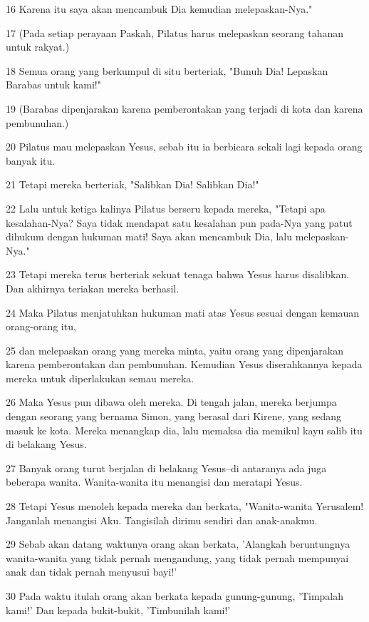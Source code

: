 \par 16 Karena itu saya akan mencambuk Dia kemudian melepaskan-Nya."
\par 17 (Pada setiap perayaan Paskah, Pilatus harus melepaskan seorang tahanan untuk rakyat.)
\par 18 Semua orang yang berkumpul di situ berteriak, "Bunuh Dia! Lepaskan Barabas untuk kami!"
\par 19 (Barabas dipenjarakan karena pemberontakan yang terjadi di kota dan karena pembunuhan.)
\par 20 Pilatus mau melepaskan Yesus, sebab itu ia berbicara sekali lagi kepada orang banyak itu.
\par 21 Tetapi mereka berteriak, "Salibkan Dia! Salibkan Dia!"
\par 22 Lalu untuk ketiga kalinya Pilatus berseru kepada mereka, "Tetapi apa kesalahan-Nya? Saya tidak mendapat satu kesalahan pun pada-Nya yang patut dihukum dengan hukuman mati! Saya akan mencambuk Dia, lalu melepaskan-Nya."
\par 23 Tetapi mereka terus berteriak sekuat tenaga bahwa Yesus harus disalibkan. Dan akhirnya teriakan mereka berhasil.
\par 24 Maka Pilatus menjatuhkan hukuman mati atas Yesus sesuai dengan kemauan orang-orang itu,
\par 25 dan melepaskan orang yang mereka minta, yaitu orang yang dipenjarakan karena pemberontakan dan pembunuhan. Kemudian Yesus diserahkannya kepada mereka untuk diperlakukan semau mereka.
\par 26 Maka Yesus pun dibawa oleh mereka. Di tengah jalan, mereka berjumpa dengan seorang yang bernama Simon, yang berasal dari Kirene, yang sedang masuk ke kota. Mereka menangkap dia, lalu memaksa dia memikul kayu salib itu di belakang Yesus.
\par 27 Banyak orang turut berjalan di belakang Yesus--di antaranya ada juga beberapa wanita. Wanita-wanita itu menangisi dan meratapi Yesus.
\par 28 Tetapi Yesus menoleh kepada mereka dan berkata, "Wanita-wanita Yerusalem! Janganlah menangisi Aku. Tangisilah dirimu sendiri dan anak-anakmu.
\par 29 Sebab akan datang waktunya orang akan berkata, 'Alangkah beruntungnya wanita-wanita yang tidak pernah mengandung, yang tidak pernah mempunyai anak dan tidak pernah menyusui bayi!'
\par 30 Pada waktu itulah orang akan berkata kepada gunung-gunung, 'Timpalah kami!' Dan kepada bukit-bukit, 'Timbunilah kami!'
